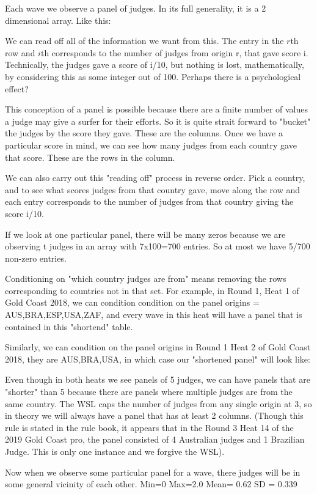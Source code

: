 \documentclass{article}
\begin{document}
Each wave we observe a panel of judges. In its full generality, it is a 2 dimensional array. Like this:

We can read off all of the information we want from this. The entry in the $r$th row and $i$th corresponds to the number of judges from origin r, that gave score i. Technically, the judges gave a score of i/10, but nothing is lost, mathematically, by considering this as some integer out of 100. Perhaps there is a psychological effect?

This conception of a panel is possible because there are a finite number of values a judge may give a surfer for their efforts. So it is quite strait forward to "bucket" the judges by the score they gave. These are the columns. Once we have a particular score in mind, we can see how many judges from each country gave that score. These are the rows in the column.

We can also carry out this "reading off" process in reverse order. Pick a country, and to see what scores judges from that country gave, move along the row and each entry corresponds to the number of judges from that country giving the score i/10.

If we look at one particular panel, there will be many zeros because we are observing t judges in an array with 7x100=700 entries. So at most we have 5/700 non-zero entries.

Conditioning on "which country judges are from" means removing the rows corresponding to countries not in that set. For example, in Round 1, Heat 1 of Gold Coast 2018, we can condition condition on the panel origins = {AUS,BRA,ESP,USA,ZAF}, and every wave in this heat will have a panel that is contained in this "shortend" table. 

Similarly, we can condition on the panel origins in Round 1 Heat 2 of Gold Coast 2018, they are {AUS,BRA,USA}, in which case our "shortened panel" will look like:

Even though in both heats we see panels of 5 judges, we can have panels that are "shorter" than 5 because there are panels where multiple judges are from the same country. The WSL caps the number of judges from any single origin at 3, so in theory we will always have a panel that has at least 2 columns. (Though this rule is stated in the rule book, it appears that in the Round 3 Heat 14 of the 2019 Gold Coast pro, the panel consisted of 4 Australian judges and 1 Brazilian Judge. This is only one instance and we forgive the WSL).

Now when we observe some particular panel for a wave, there judges will be in some general vicinity of each other.
Min=0
Max=2.0
Mean= 0.62
SD = 0.339
\end{document}
